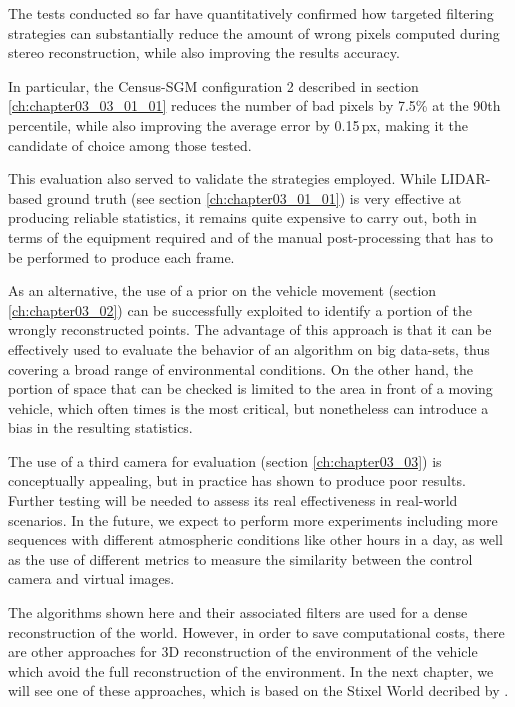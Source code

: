 The tests conducted so far have quantitatively confirmed how targeted filtering strategies can substantially reduce the amount of wrong pixels computed during stereo reconstruction, while also improving the results accuracy.

In particular, the Census-SGM configuration 2 described in section \ref{ch:chapter03_03_01_01} reduces the number of bad pixels by 7.5\% at the 90th percentile, while also improving the average error by 0.15\,px, making it the candidate of choice among those tested.

This evaluation also served to validate the strategies employed. While LIDAR-based ground truth (see section \ref{ch:chapter03_01_01}) is very effective at producing reliable statistics, it remains quite expensive to carry out, both in terms of the equipment required and of the manual post-processing that has to be performed to produce each frame.

As an alternative, the use of a prior on the vehicle movement (section \ref{ch:chapter03_02}) can be successfully exploited to identify a portion of the wrongly reconstructed points. The advantage of this approach is that it can be effectively used to evaluate the behavior of an algorithm on big data-sets, thus covering a broad range of environmental conditions. On the other hand, the portion of space that can be checked is limited to the area in front of a moving vehicle, which often times is the most critical, but nonetheless can introduce a bias in the resulting statistics.

The use of a third camera for evaluation (section \ref{ch:chapter03_03}) is conceptually appealing, but in practice has shown to produce poor results. Further testing will be needed to assess its real effectiveness in real-world scenarios. In the future, we expect to perform more experiments including more sequences with different atmospheric conditions like other hours in a day, as well as the use of different metrics to measure the similarity between the control camera and virtual images.

The algorithms shown here and their associated filters are used for a dense reconstruction of the world. However, in order to save computational costs, there are other approaches for 3D reconstruction of the environment of the vehicle which avoid the full reconstruction of the environment. In the next chapter, we will see one of these approaches, which is based on the Stixel World decribed by \cite{badino2009stixel}.

